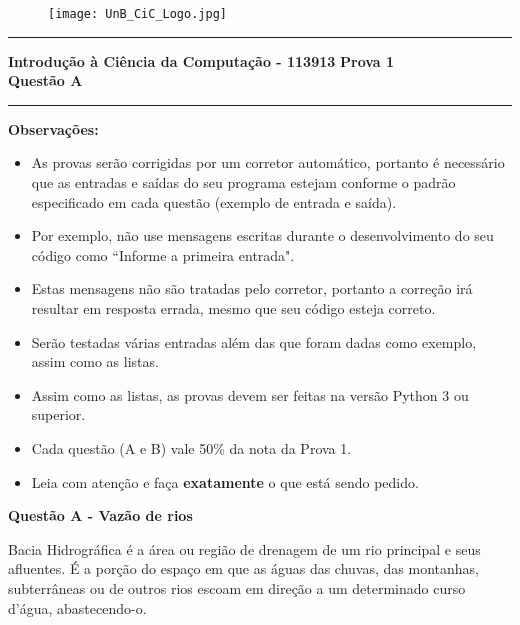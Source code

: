 \documentclass[a4paper, 12pt]{article}
\begin{document}
\begin{figure}[H]
	\texttt{[image: UnB\_CiC\_Logo.jpg]}
\end{figure}
\noindent\rule{\textwidth}{0.4pt}
\begin{center}
	\textbf{{\Large Introdução à Ciência da Computação - 113913}} \newline \newline
	\textbf{{\large Prova 1} \\
	\vspace{9pt}
	{\large Questão A}} \\
	\noindent\rule{\textwidth}{0.4pt}
	\newline
\end{center}

\textbf{{\large Observações:}}
\begin{itemize}
	\item As provas serão corrigidas por um corretor automático, portanto é necessário que as entradas e saídas do seu programa estejam conforme o padrão especificado em cada questão (exemplo de entrada e saída).
	\item Por exemplo, não use mensagens escritas durante o desenvolvimento do seu código como “Informe a primeira entrada".
	\item Estas mensagens não são tratadas pelo corretor, portanto a correção irá resultar em resposta errada, mesmo que seu código esteja correto.
	\item Serão testadas várias entradas além das que foram dadas como exemplo, assim como as listas.
	\item Assim como as listas, as provas devem ser feitas na versão Python 3 ou superior.
	\item Cada questão (A e B) vale 50\% da nota da Prova 1.
	\item Leia com atenção e faça \textbf{exatamente} o que está sendo pedido.


\end{itemize}
\newpage %
\begin{center}
\textbf{{\Large Questão A - Vazão de rios}}
\end{center}

\vspace{5pt} 

Bacia Hidrográfica é a área ou região de drenagem de um rio principal e seus afluentes. É a porção do espaço em que as águas das chuvas, das montanhas, subterrâneas ou de outros rios escoam em direção a um determinado curso d’água, abastecendo-o.
\end{document}
